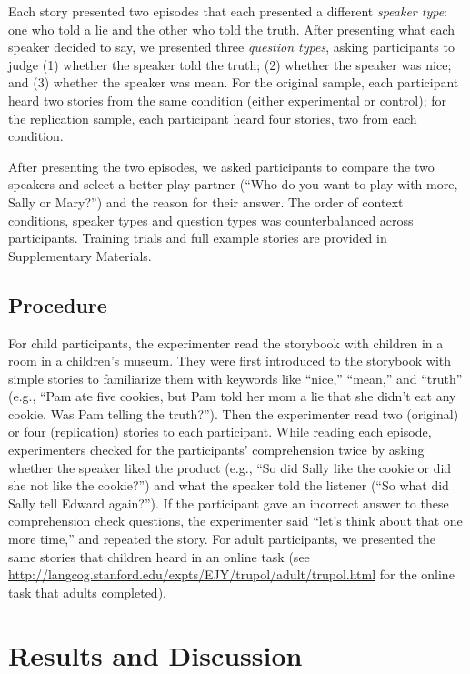\documentclass[oneside]{report}
\begin{document}
Each story presented two episodes that each presented a different
\emph{speaker type}: one who told a lie and the other who told the
truth. After presenting what each speaker decided to say, we presented
three \emph{question types}, asking participants to judge (1) whether
the speaker told the truth; (2) whether the speaker was nice; and (3)
whether the speaker was mean. For the original sample, each participant
heard two stories from the same condition (either experimental or
control); for the replication sample, each participant heard four
stories, two from each condition.

After presenting the two episodes, we asked participants to compare the
two speakers and select a better play partner (``Who do you want to play
with more, Sally or Mary?'') and the reason for their answer. The order
of context conditions, speaker types and question types was
counterbalanced across participants. Training trials and full example
stories are provided in Supplementary Materials.

\subsection{Procedure}\label{procedure-3}

For child participants, the experimenter read the storybook with
children in a room in a children's museum. They were first introduced to
the storybook with simple stories to familiarize them with keywords like
``nice,'' ``mean,'' and ``truth'' (e.g., ``Pam ate five cookies, but Pam
told her mom a lie that she didn't eat any cookie. Was Pam telling the
truth?''). Then the experimenter read two (original) or four
(replication) stories to each participant. While reading each episode,
experimenters checked for the participants' comprehension twice by
asking whether the speaker liked the product (e.g., ``So did Sally like
the cookie or did she not like the cookie?'') and what the speaker told
the listener (``So what did Sally tell Edward again?''). If the
participant gave an incorrect answer to these comprehension check
questions, the experimenter said ``let's think about that one more
time,'' and repeated the story. For adult participants, we presented the
same stories that children heard in an online task (see
\url{http://langcog.stanford.edu/expts/EJY/trupol/adult/trupol.html} for
the online task that adults completed).

\section{Results and Discussion}\label{results-and-discussion-3}
\end{document}
